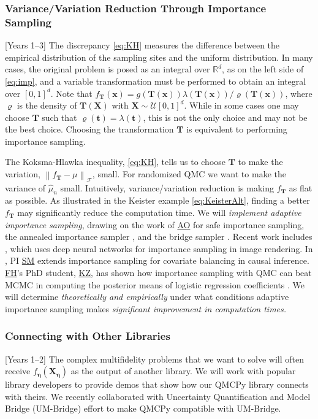 \documentclass[11pt]{NSFamsart}
\newcommand{\FH}{\hyperlink{FHlink}{FH}\xspace}
\newcommand{\SM}{\hyperlink{SMlink}{SM}\xspace}
\newcommand{\AO}{\hyperlink{AOlink}{AO}\xspace}
\newcommand{\KZ}{\hyperlink{KZlink}{KZ}\xspace}
\newcommand{\QMCPy}{QMCPy\xspace}
\newcommand{\fidparam}{\bldeta}
\newcommand{\reals}{{\mathbb{R}}}
\newcommand{\bt}{{\boldsymbol{t}}}
\newcommand{\bT}{{\boldsymbol{T}}}
\newcommand{\bx}{{\boldsymbol{x}}}
\newcommand{\bX}{{\boldsymbol{X}}}
\newcommand{\bldeta}{{\boldsymbol{\eta}}}
\newcommand{\calf}{{\mathcal{F}}}
\newcommand{\calu}{{\mathcal{U}}}
\newcommand{\norm}[2][{}]{\ensuremath{\left \lVert #2 \right \rVert}_{#1}}
\newcommand{\hmu}{\hat{\mu}}
\begin{document}
\subsubsection{Variance/Variation Reduction Through Importance Sampling} \label{sec:imp} %
[Years 1--3]  The discrepancy \eqref{eq:KH} measures the difference between the empirical distribution of the sampling sites and the uniform distribution.  In many cases, the original problem is posed as an integral over $\reals^d$, as on the left side of \eqref{eq:imp}, and a variable transformation must be performed to obtain an integral over $[0,1]^d$.  Note that $f_{\bT}(\bx) = g(\bT(\bx)) \lambda(\bT(\bx)) / \varrho(\bT(\bx))$, where $\varrho$ is the density of $\bT(\bX)$ with $\bX \sim \calu[0,1]^d$.  While in some cases one may choose $\bT$ such that $\varrho(\bt) = \lambda(\bt)$, this is not the only choice and may not be the best choice.  Choosing the transformation $\bT$ is equivalent to performing importance sampling.   

The Koksma-Hlawka inequality, \eqref{eq:KH}, tells us to choose $\bT$ to make the variation, $\norm[\calf]{f_{\bT} - \mu}$, small.  For randomized QMC we want to make the variance of $\hmu_n$ small.  Intuitively, variance/variation reduction is making $f_{\bT}$ as flat as possible. As illustrated in the Keister example \eqref{eq:KeisterAlt}, finding a better $f_{\bT}$ may significantly reduce the computation time.  We will \emph{implement adaptive importance sampling}, drawing on the work of  
\AO \cite{owen2000safe} for safe importance sampling, the  annealed importance sampler \cite{neal2001annealed}, and the bridge sampler \cite{gelman1998simulating}.  Recent work includes \cite{mueller2019neural}, which uses deep neural networks for importance sampling in image rendering.  In \cite{huling2020energy}, PI \SM extends importance sampling for covariate balancing in causal inference.  \FH's PhD student, \KZ, has shown how importance sampling with QMC can beat MCMC in computing the posterior means of logistic regression coefficients \cite{Zha21a}.  We will determine \emph{theoretically and empirically} under what conditions adaptive importance sampling makes \emph{significant improvement in computation times.}




\subsubsection{Connecting with Other Libraries} [Years 1--2] \label{sec:playwell}
The complex multifidelity problems that we want to solve will often receive $f_{\fidparam}(\bX_{\fidparam})$ as the output of another library.  We will work with popular library developers to provide demos that show  how our \QMCPy library connects with theirs.  We recently collaborated with Uncertainty Quantification and Model Bridge (UM-Bridge) effort \cite{umbridge} to make \QMCPy compatible with UM-Bridge.
\end{document}
